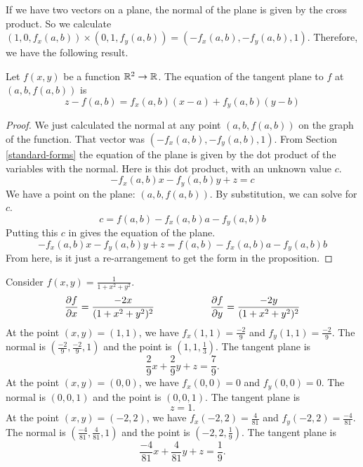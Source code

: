 \documentclass[fleqn,letterpaper]{report}
\begin{document}
If we have two vectors on a plane, the normal of the plane is
given by the cross product. So we calculate $(1,0, f_x(a,b))
\times (0,1, f_y(a,b)) = (-f_x(a,b), -f_y(a,b),1)$. Therefore,
we have the following result.

\begin{prop}
Let $f(x,y)$ be a function $\mathbb{R}^2 \rightarrow \mathbb{R}$. The
equation of the tangent plane to $f$ at $(a,b,f(a,b))$ is 
\begin{equation*}
z - f(a,b) = f_x(a,b) (x-a) + f_y(a,b) (y-b)
\end{equation*}
\end{prop}

\begin{proof}
We just calculated the normal at any point $(a,b,f(a,b))$ on
the graph of the function. That vector was $(-f_x(a,b),
-f_y(a,b),1)$. From Section \ref{standard-forms} the equation
of the plane is given by the dot product of the variables with
the normal. Here is this dot product, with an unknown value
$c$. 
\begin{equation*}
- f_x(a,b) x - f_y(a,b) y + z = c
\end{equation*}
We have a point on the plane: $(a,b,f(a,b))$. By substitution,
we can solve for $c$.
\begin{equation*}
c = f(a,b) - f_x(a,b) a - f_y(a,b) b
\end{equation*} 
Putting this $c$ in gives the equation of the plane.
\begin{equation*}
- f_x(a,b) x - f_y(a,b) y + z = f(a,b) - f_x(a,b)a - f_y(a,b)b 
\end{equation*}
From here, is it just a re-arrangement to get the form in the
proposition. 
\end{proof}

\begin{example}
\label{example-tangent-plane}
Consider $f(x,y) = \frac{1}{1 + x^2 + y^2}$. 
\begin{equation*}
\frac{\partial f}{\partial x} = \frac{-2x}{(1+x^2+y^2)^2} \hspace{2cm}
\frac{\partial f}{\partial y} = \frac{-2y}{(1+x^2+y^2)^2} 
\end{equation*}
At the point $(x,y) = (1,1)$, we have $f_x(1,1) =
\frac{-2}{9}$ and $f_y(1,1) = \frac{-2}{9}$. The normal is
$\left( \frac{-2}{9}, \frac{-2}{9}, 1 \right)$ and the point
is $\left(1,1, \frac{1}{3} \right)$. The tangent plane is 
\begin{equation*}
\frac{2}{9} x + \frac{2}{9} y + z = \frac{7}{9}.
\end{equation*}
At the point $(x,y) = (0,0)$, we have $f_x(0,0) =
0$ and $f_y(0,0) = 0$. The normal is
$(0,0,1)$ and the point is $(0,0,1)$. The tangent plane is
\begin{equation*}
z=1.
\end{equation*}
At the point $(x,y) = (-2,2)$, we have $f_x(-2,2) =
\frac{4}{81}$ and $f_y(-2,2) = \frac{-4}{81}$. The normal is
$\left( \frac{-4}{81}, \frac{4}{81}, 1 \right)$ and the point
is $\left(-2,2, \frac{1}{9} \right)$. The tangent plane is 
\begin{equation*}
\frac{-4}{81} x + \frac{4}{81} y + z = \frac{1}{9}.
\end{equation*}
\end{example}
\end{document}
